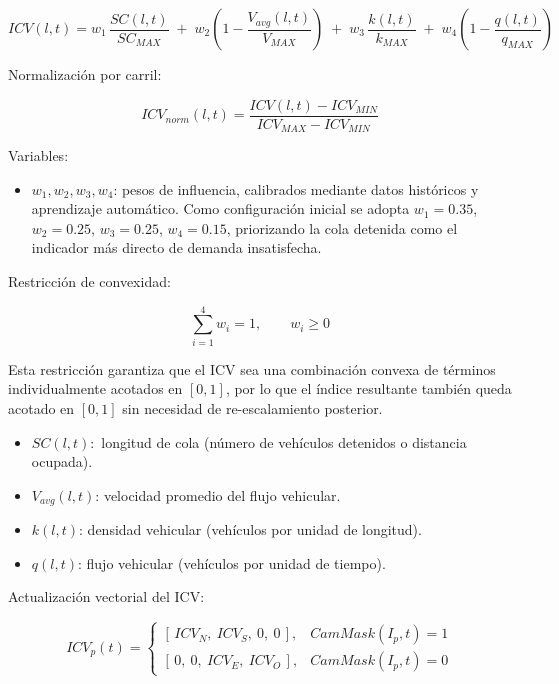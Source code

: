 \documentclass[12pt,a4paper,oneside]{report}
\begin{document}
\begin{equation}
ICV(l,t) = w_{1}\,\frac{SC(l,t)}{SC_{MAX}} \;+\; w_{2}\left(1 - \frac{V_{avg}(l,t)}{V_{MAX}}\right) \;+\; w_{3}\,\frac{k(l,t)}{k_{MAX}} \;+\; w_{4}\left(1 - \frac{q(l,t)}{q_{MAX}}\right)
\label{eq:icv}
\end{equation}

Normalización por carril:

\begin{equation}
ICV_{norm}(l,t) = \frac{ICV(l,t) - ICV_{MIN}}{ICV_{MAX} - ICV_{MIN}}
\end{equation}

Variables:

\begin{itemize}
\item
  \(w_{1}, w_{2}, w_{3}, w_{4}\): pesos de influencia, calibrados mediante datos históricos y aprendizaje automático. Como configuración inicial se adopta \(w_{1}=0.35\), \(w_{2}=0.25\), \(w_{3}=0.25\), \(w_{4}=0.15\), priorizando la cola detenida como el indicador más directo de demanda insatisfecha.
\end{itemize}

Restricción de convexidad:

\begin{equation}
\sum_{i = 1}^{4}w_{i} = 1, \qquad w_{i} \geq 0
\end{equation}

Esta restricción garantiza que el ICV sea una combinación convexa de términos individualmente acotados en \([0,1]\), por lo que el índice resultante también queda acotado en \([0,1]\) sin necesidad de re-escalamiento posterior.

\begin{itemize}
\item
  \(SC(l,t):\) longitud de cola (número de vehículos detenidos o distancia ocupada).
\item
  \(V_{avg}(l,t)\): velocidad promedio del flujo vehicular.
\item
  \(k(l,t)\): densidad vehicular (vehículos por unidad de longitud).
\item
  \(q(l,t)\): flujo vehicular (vehículos por unidad de tiempo).
\end{itemize}

Actualización vectorial del ICV:

\begin{equation}
ICV_{p}(t) =
\begin{cases}
\left[\, ICV_{N},\ ICV_{S},\ 0,\ 0 \,\right], & CamMask(I_{p},t) = 1\\[2pt]
\left[\, 0,\ 0,\ ICV_{E},\ ICV_{O} \,\right], & CamMask(I_{p},t) = 0
\end{cases}
\end{equation}
\end{document}
